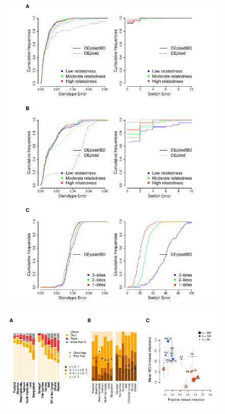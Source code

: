 \documentclass{article}
\begin{document}
\newpage{}
\begin{figure}[htp]
  \begin{center}
  \includegraphics[width=\textwidth]{Fig3.pdf}
   \end{center}
\end{figure}
\newpage{}
\begin{figure}[htp]
  \begin{center}
  \includegraphics[width=\textwidth]{Fig4.pdf}
   \end{center}
\end{figure}
\end{document}
